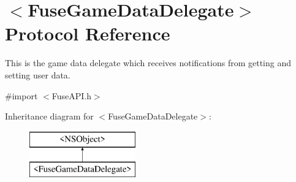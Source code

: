 \hypertarget{protocol_fuse_game_data_delegate-p}{}\section{$<$Fuse\+Game\+Data\+Delegate$>$ Protocol Reference}
\label{protocol_fuse_game_data_delegate-p}


This is the game data delegate which receives notifications from getting and setting user data.  




{\ttfamily \#import $<$Fuse\+A\+P\+I.\+h$>$}

Inheritance diagram for $<$Fuse\+Game\+Data\+Delegate$>$\+:\begin{figure}[H]
\begin{center}
\leavevmode
\includegraphics[height=2.000000cm]{protocol_fuse_game_data_delegate-p}
\end{center}
\end{figure}
